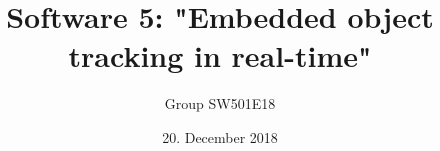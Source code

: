\title{Software 5: "Embedded object tracking in real-time"} %
\date{20. December 2018}                                                        %
\def\groupnumber{Group SW501E18}                                                  %
\author{\groupnumber}                                                             %

\let\theauthor\author
\let\thedate\date


